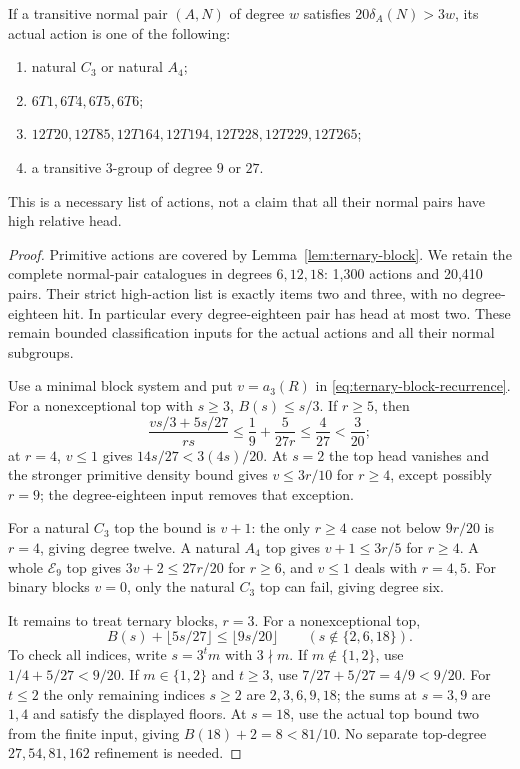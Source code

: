 \begin{theorem}\label{thm:three-twentieths}
If a transitive normal pair $(A,N)$ of degree $w$ satisfies
$20\delta_A(N)>3w$, its actual action is one of the following:
\begin{enumerate}
\item natural $C_3$ or natural $A_4$;
\item $6T1,6T4,6T5,6T6$;
\item $12T20,12T85,12T164,12T194,12T228,12T229,12T265$;
\item a transitive $3$-group of degree $9$ or $27$.
\end{enumerate}
This is a necessary list of actions, not a claim that all their normal
pairs have high relative head.
\end{theorem}
\begin{proof}
Primitive actions are covered by Lemma~\ref{lem:ternary-block}.
We retain the complete normal-pair catalogues in degrees $6,12,18$:
1,300 actions and 20,410 pairs. Their strict high-action list is
exactly items two and three, with no degree-eighteen hit. In particular
every degree-eighteen pair has head at most two. These remain bounded
classification inputs for the actual actions and all their normal subgroups.

Use a minimal block system and put $v=a_3(R)$ in
\eqref{eq:ternary-block-recurrence}. For a nonexceptional top with
$s\geq3$, $B(s)\leq s/3$. If $r\geq5$, then
\[
 \frac{vs/3+5s/27}{rs}\leq\frac19+\frac5{27r}
 \leq\frac4{27}<\frac3{20};
\]
at $r=4$, $v\leq1$ gives $14s/27<3(4s)/20$.
At $s=2$ the top head vanishes and the stronger primitive density
bound gives $v\leq3r/10$ for $r\geq4$, except possibly $r=9$;
the degree-eighteen input removes that exception.

For a natural $C_3$ top the bound is $v+1$: the only $r\geq4$
case not below $9r/20$ is $r=4$, giving degree twelve. A natural
$A_4$ top gives $v+1\leq3r/5$ for $r\geq4$.
A whole $\mathcal E_9$ top gives
$3v+2\leq27r/20$ for $r\geq6$, and $v\leq1$ deals with $r=4,5$.
For binary blocks $v=0$, only the natural $C_3$ top can fail,
giving degree six.

It remains to treat ternary blocks, $r=3$. For a nonexceptional top,
\[
 B(s)+\lfloor5s/27\rfloor\leq\lfloor9s/20\rfloor
 \qquad(s\notin\{2,6,18\}).
\]
To check all indices, write $s=3^tm$ with $3\nmid m$.
If $m\notin\{1,2\}$, use $1/4+5/27<9/20$.
If $m\in\{1,2\}$ and $t\geq3$, use
$7/27+5/27=4/9<9/20$. For $t\leq2$ the only remaining
indices $s\geq2$ are $2,3,6,9,18$; the sums at $s=3,9$ are
$1,4$ and satisfy the displayed floors. At $s=18$, use the actual
top bound two from the finite input, giving $B(18)+2=8<81/10$.
No separate top-degree $27,54,81,162$ refinement is needed.


\end{proof}
